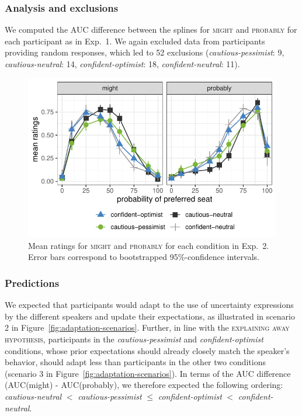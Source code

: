 \documentclass[man,floatsintext]{apa6}
\begin{document}
\subsubsection{Analysis and exclusions}

We computed the AUC difference between the splines for  \textsc{might} and \textsc{probably} for each participant as in Exp.~1. We again excluded data from participants providing random responses, which led to 52 exclusions (\textit{cautious-pessimist}: 9, \textit{cautious-neutral}: 14, \textit{confident-optimist}: 18, \textit{confident-neutral}: 11).

\begin{figure}[t]
    \centering
    \includegraphics[width=.5\columnwidth]{explaining-away.pdf}
    \caption{Mean ratings for \textsc{might} and \textsc{probably} for each condition in Exp.~2. Error bars correspond to bootstrapped 95\%-confidence intervals.}
    \label{fig:results-exp2}
\end{figure}
\subsubsection{Predictions}

We expected that participants would adapt to the use of uncertainty expressions by the different speakers and update their expectations, as illustrated in scenario 2 in Figure~\ref{fig:adaptation-scenarios}. Further, in line with the \textsc{explaining away hypothesis}, participants in the \textit{cautious-pessimist} and \textit{confident-optimist} conditions, whose prior expectations should already closely match the speaker's behavior,  should adapt less than participants in the other two conditions (scenario 3 in Figure~\ref{fig:adaptation-scenarios}). In terms of the AUC difference (AUC(might) - AUC(probably), we therefore expected the following ordering: \textit{cautious-neutral} $<$  \textit{cautious-pessimist} $\leq$ \textit{confident-optimist} $<$ \textit{confident-neutral}.
\end{document}
